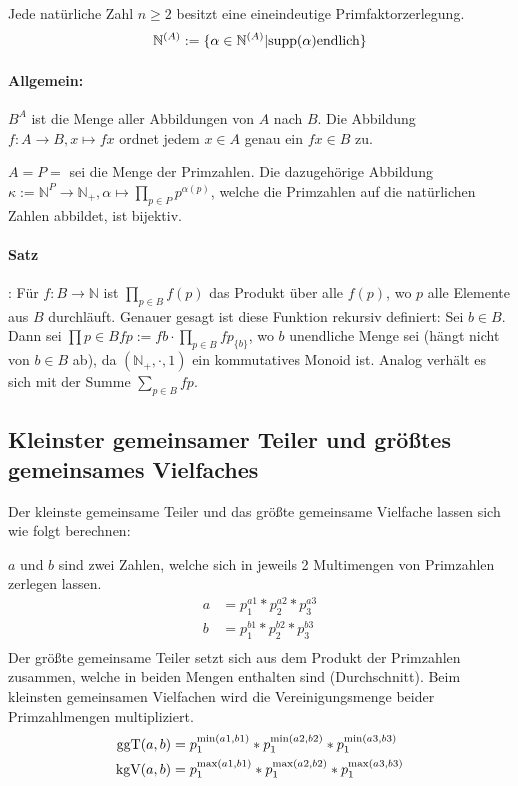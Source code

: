 Jede natürliche Zahl $n \ge 2$ besitzt eine eineindeutige
Primfaktorzerlegung.
\begin{align*}
\mathbb N^{(A)} := \{ \alpha \in \mathbb N^{(A)} | \text{supp}(\alpha) \text{endlich}
\}
\end{align*}

\paragraph{Allgemein:} $B^A$ ist die Menge aller Abbildungen von $A$ nach $B$.
Die Abbildung $f: A \rightarrow B, x \mapsto f x$ ordnet jedem $x \in A$ genau
ein $f x \in B$ zu.

$A = P = $ sei die Menge der Primzahlen.
Die dazugehörige Abbildung $\kappa:= \mathbb N^P \rightarrow \mathbb N_+,
\alpha \mapsto \prod \limits_{p \in P} p^{\alpha(p)}$, welche die Primzahlen
auf die natürlichen Zahlen abbildet, ist bijektiv.

\paragraph{Satz}: Für $f: B \rightarrow \mathbb N$ ist $\prod \limits_{p \in B}
f(p)$ das Produkt über alle $f(p)$, wo $p$ alle Elemente aus $B$ durchläuft.
Genauer gesagt ist diese Funktion \glqq rekursiv definiert\grqq: Sei $b \in B$.
Dann sei $\prod \limits{p \in B} f p := f b \cdot \prod \limits_{p \in B}
f p_{ \{b \}}$, wo $b$ unendliche Menge sei (hängt nicht von $b \in B$ ab), da
$(\mathbb N_+, \cdot, 1)$ ein kommutatives Monoid ist. Analog verhält es sich
mit der Summe $\sum \limits_{p \in B} fp$.

\subsection{Kleinster gemeinsamer Teiler und größtes gemeinsames Vielfaches}

Der kleinste gemeinsame Teiler und das größte gemeinsame Vielfache
lassen sich wie folgt berechnen:

$a$ und $b$ sind zwei Zahlen, welche sich in jeweils 2 Multimengen von
Primzahlen zerlegen lassen.
\begin{align*}
  a &= p_1^{a1} * p_2^{a2} * p_3^{a3}\\
  b &= p_1^{b1} * p_2^{b2} * p_3^{b3}\\
\end{align*}
Der größte gemeinsame Teiler setzt sich aus dem Produkt der
Primzahlen zusammen, welche in beiden Mengen enthalten sind
(Durchschnitt). Beim kleinsten gemeinsamen Vielfachen wird die
Vereinigungsmenge beider Primzahlmengen multipliziert.
\begin{align*}
  \text{ggT}(a,b) &= p_1^{\min(a1,b1)} * p_1^{\min(a2,b2)} * p_1^{\min(a3,b3)}\\
  \text{kgV}(a,b) &= p_1^{\max(a1,b1)} * p_1^{\max(a2,b2)} * p_1^{\max(a3,b3)}\\
\end{align*}

